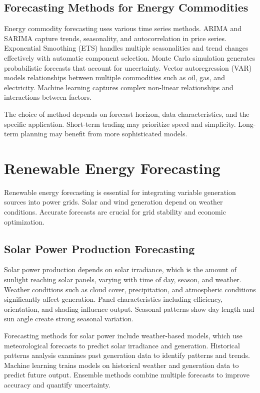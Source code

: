 \subsection{Forecasting Methods for Energy Commodities}

Energy commodity forecasting uses various time series methods. ARIMA and SARIMA capture trends, seasonality, and autocorrelation in price series. Exponential Smoothing (ETS) handles multiple seasonalities and trend changes effectively with automatic component selection. Monte Carlo simulation generates probabilistic forecasts that account for uncertainty. Vector autoregression (VAR) models relationships between multiple commodities such as oil, gas, and electricity. Machine learning captures complex non-linear relationships and interactions between factors.

The choice of method depends on forecast horizon, data characteristics, and the specific application. Short-term trading may prioritize speed and simplicity. Long-term planning may benefit from more sophisticated models.

\section{Renewable Energy Forecasting}

Renewable energy forecasting is essential for integrating variable generation sources into power grids. Solar and wind generation depend on weather conditions. Accurate forecasts are crucial for grid stability and economic optimization.

\subsection{Solar Power Production Forecasting}

Solar power production depends on solar irradiance, which is the amount of sunlight reaching solar panels, varying with time of day, season, and weather. Weather conditions such as cloud cover, precipitation, and atmospheric conditions significantly affect generation. Panel characteristics including efficiency, orientation, and shading influence output. Seasonal patterns show day length and sun angle create strong seasonal variation.

Forecasting methods for solar power include weather-based models, which use meteorological forecasts to predict solar irradiance and generation. Historical patterns analysis examines past generation data to identify patterns and trends. Machine learning trains models on historical weather and generation data to predict future output. Ensemble methods combine multiple forecasts to improve accuracy and quantify uncertainty.

